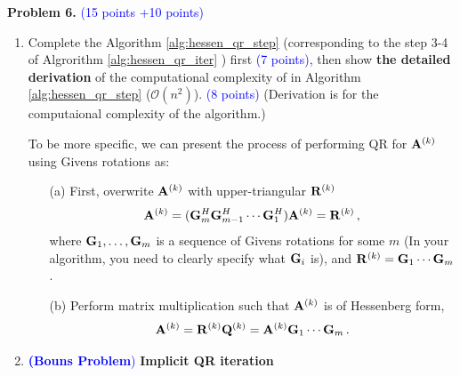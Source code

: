\documentclass[english,onecolumn]{IEEEtran}
\newcommand{\bigO}{\mathcal{O}}
\newcommand{\bA}{{\bf A}}
\newcommand{\bQ}{{\bf Q}}
\newcommand{\bR}{{\bf R}}
\newcommand{\bG}{{\bf G}}
\begin{document}
\clearpage
\textbf{Problem 6.}
\textcolor{blue}{(15 points +10 points)}

\noindent
\begin{enumerate}
    \item Complete the Algorithm \ref{alg:hessen_qr_step} (corresponding to the step 3-4 of Algrorithm \ref{alg:hessen_qr_iter} ) first \textcolor{blue}{(7 points)}, then
show \textbf{the detailed derivation} of the computational complexity of in Algorithm \ref{alg:hessen_qr_step} ($\bigO(n^2)$). \textcolor{blue}{(8 points)}
(Derivation is for the computaional complexity of the algorithm.)

To be more specific, we can present the process of performing QR for $\bA^{(k)}$ using Givens rotations as:
\begin{enumerate}
\item[(a)] First, overwrite $\bA^{(k)}$ with upper-triangular $\bR^{(k)}$
\[
\bA^{(k)} = (\bG_{m}^H \bG_{m-1}^H \cdots \bG_{1}^H) \bA^{(k)} = \bR^{(k)}\,,
\]
where $\bG_{1},\ldots,\bG_{m}$ is a sequence of Givens rotations for some $m$ (In your algorithm, you need to clearly specify what $\bG_i$ is), and $\bR^{(k)}=\bG_1 \cdots \bG_{m}$.
\item[(b)] Perform matrix multiplication such that $\bA^{(k)}$ is of Hessenberg form,
\[
\bA^{(k)} = \bR^{(k)}\bQ^{(k)} = \bA^{(k)}\bG_1 \cdots \bG_{m}\,.
\]
\end{enumerate}
\item 
\textcolor{blue}{\textbf{(Bouns Problem})}
\textbf{Implicit QR iteration}


\end{enumerate}
\end{document}
